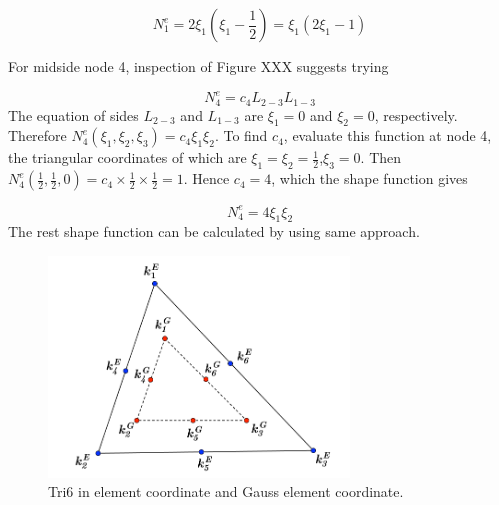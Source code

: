 \begin{equation}
N_1^e = 2\xi_1\left(\xi_1 - \frac{1}{2}\right) = \xi_1 \left(2 \xi_1 -1 \right)
\end{equation} 

For midside node 4, inspection of Figure XXX suggests trying

\begin{equation}
N_4^e = c_4L_{2-3}L_{1-3}
\end{equation}
The equation of sides $L_{2-3}$ and $L_{1-3}$ are $\xi_1 = 0$ and $\xi_2 = 0$, respectively. Therefore $N_4^e\left(\xi_1, \xi_2, \xi_3\right) = c_4\xi_1\xi_2$. To find $c_4$, evaluate this function at node 4, the triangular coordinates of which are $\xi_1 = \xi_2 = \frac{1}{2}$,$\xi_3 = 0$. Then $N_4^e\left(\frac{1}{2}, \frac{1}{2}, 0\right) = c_4 \times \frac{1}{2} \times \frac{1}{2} = 1$. Hence $c_4 = 4$, which the shape function gives

\begin{equation}
N_4^e = 4\xi_1\xi_2
\end{equation}
The rest shape function can be calculated by using same approach. 
\begin{center}
	
\end{center}

\begin{figure}[h]
	\begin{center}
		\includegraphics[width=8cm,clip]{Tri6_1.pdf} 		
		\caption{Tri6 in element coordinate and Gauss element coordinate.} \label{fig: Tri6_1}	
	\end{center} 
\end{figure}

